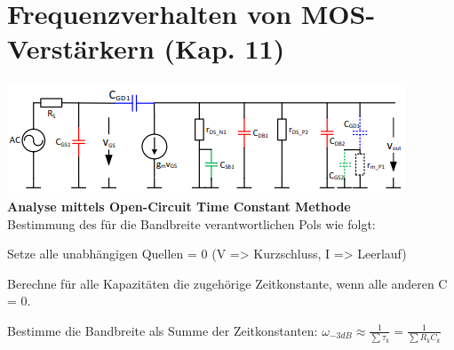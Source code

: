
\section{Frequenzverhalten von MOS-Verstärkern (Kap. 11)}
\includegraphics[width=0.5\linewidth]{chapters/Frequenzverhalten/images/parasitaere_kapazitaeten}
\textbf{Analyse mittels Open-Circuit Time Constant Methode} \\
Bestimmung des für die Bandbreite verantwortlichen Pols wie folgt:
\begin{compactenum}
	\item Setze alle unabhängigen Quellen = 0 (V => Kurzschluss, I => Leerlauf)
	\item Berechne für alle Kapazitäten die zugehörige Zeitkonstante, wenn alle anderen C = 0.
	\item Bestimme die Bandbreite als Summe der Zeitkonstanten: $\omega_{-3dB}\approx \frac{1}{\sum\tau_k}=\frac{1}{\sum R_kC_k}$
\end{compactenum}


